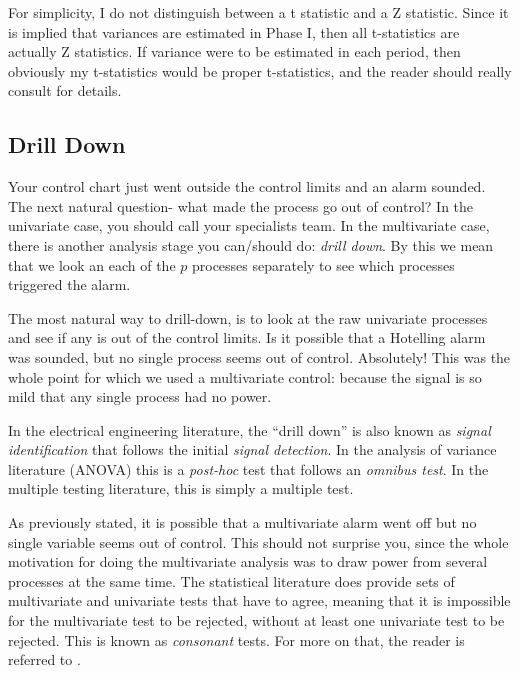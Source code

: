 \begin{remark}
For simplicity, I do not distinguish between a t statistic and a Z statistic.
Since it is implied that variances are estimated in Phase I, then all t-statistics are actually Z statistics.
If variance were to be estimated in each period, then obviously my t-statistics would be proper t-statistics, and the reader should really consult  \cite[Ch.7]{qiu_introduction_2013} for details. 
\end{remark}




\subsection{Drill Down}
Your control chart just went outside the control limits and an alarm sounded.
The next natural question- what made the process go out of control?
In the univariate case, you should call your specialists team. 
In the multivariate case, there is another analysis stage you can/should do: \emph{drill down}.
By this we mean that we look an each of the $p$ processes separately to see which processes triggered the alarm.

The most natural way to drill-down, is to look at the raw univariate processes and see if any is out of the control limits.
Is it possible that a Hotelling alarm was sounded, but no single process seems out of control.
Absolutely! 
This was the whole point for which we used a multivariate control: because the signal is so mild that any single process had no power.

\begin{extra}
In the electrical engineering literature, the ``drill down'' is also known as \emph{signal identification} that follows the initial \emph{signal detection}. 
In the analysis of variance literature (ANOVA) this is a \emph{post-hoc} test that follows an \emph{omnibus test}.
In the multiple testing literature, this is simply a multiple test. 
\end{extra}

\begin{extra}
As previously stated, it is possible that a multivariate alarm went off but no single variable seems out of control. 
This should not surprise you, since the whole motivation for doing the multivariate analysis was to draw power from several processes at the same time. 
The statistical literature does provide sets of multivariate and univariate tests that have to agree, meaning that it is impossible for the multivariate test to be rejected, without at least one univariate test to be rejected. 
This is known as \emph{consonant} tests. For more on that, the reader is referred to \cite{goeman_multiple_2011}.
\end{extra}




